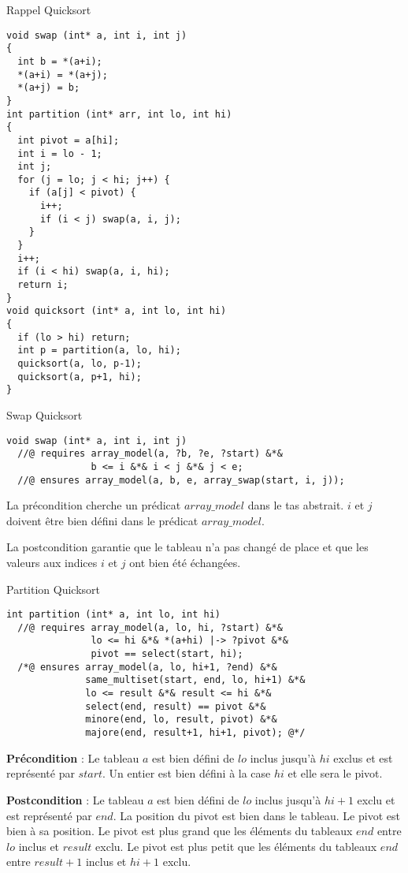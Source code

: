 \documentclass[9pt]{beamer}
\begin{document}
\begin{frame}[fragile]{Rappel Quicksort}
\begin{lstlisting}[basicstyle=\footnotesize]
void swap (int* a, int i, int j)
{
  int b = *(a+i);
  *(a+i) = *(a+j);
  *(a+j) = b;
}
int partition (int* arr, int lo, int hi)
{
  int pivot = a[hi];
  int i = lo - 1;
  int j;
  for (j = lo; j < hi; j++) {
    if (a[j] < pivot) {
      i++;
      if (i < j) swap(a, i, j);
    }
  }
  i++;
  if (i < hi) swap(a, i, hi);
  return i;
}
void quicksort (int* a, int lo, int hi)
{
  if (lo > hi) return;
  int p = partition(a, lo, hi);
  quicksort(a, lo, p-1);
  quicksort(a, p+1, hi);
}

		\end{lstlisting}

\end{frame}

\begin{frame}[fragile]{Swap Quicksort}
	\begin{lstlisting}[basicstyle=\footnotesize]
void swap (int* a, int i, int j)
  //@ requires array_model(a, ?b, ?e, ?start) &*&
               b <= i &*& i < j &*& j < e;
  //@ ensures array_model(a, b, e, array_swap(start, i, j));
	\end{lstlisting}
	La pr\'econdition cherche un pr\'edicat $array\_model$ dans le tas abstrait. $i$ et $j$ doivent \^etre bien d\'efini dans le pr\'edicat $array\_model$.
	
	La postcondition garantie que le tableau n'a pas chang\'e de place et que les valeurs aux indices $i$ et $j$ ont bien \'et\'e \'echang\'ees.
\end{frame}

\begin{frame}[fragile]{Partition Quicksort}
	\begin{lstlisting}[basicstyle=\footnotesize]
int partition (int* a, int lo, int hi)
  //@ requires array_model(a, lo, hi, ?start) &*& 
               lo <= hi &*& *(a+hi) |-> ?pivot &*& 
               pivot == select(start, hi);
  /*@ ensures array_model(a, lo, hi+1, ?end) &*& 
              same_multiset(start, end, lo, hi+1) &*&
              lo <= result &*& result <= hi &*&
              select(end, result) == pivot &*&
              minore(end, lo, result, pivot) &*&
              majore(end, result+1, hi+1, pivot); @*/
	\end{lstlisting}
	\textbf{Pr\'econdition} : Le tableau $a$ est bien d\'efini de $lo$ inclus jusqu'\`a $hi$ exclus et est repr\'esent\'e par $start$. Un entier est bien d\'efini \`a la case $hi$ et elle sera le pivot.
	
	\textbf{Postcondition} : Le tableau $a$ est bien d\'efini de $lo$ inclus jusqu'\`a $hi+1$ exclu et est repr\'esent\'e par $end$. La position du pivot est bien dans le tableau. Le pivot est bien \`a sa position. Le pivot est plus grand que les \'el\'ements du tableaux $end$ entre $lo$ inclus et $result$ exclu. Le pivot est plus petit que les \'el\'ements du tableaux $end$ entre $result+1$ inclus et $hi+1$ exclu.
\end{frame}
\end{document}
